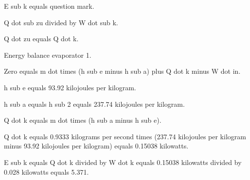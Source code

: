 E sub k equals question mark.

Q dot sub zu divided by W dot sub k.

Q dot zu equals Q dot k.

Energy balance evaporator 1.

Zero equals m dot times (h sub e minus h sub a) plus Q dot k minus W dot in.

h sub e equals 93.92 kilojoules per kilogram.

h sub a equals h sub 2 equals 237.74 kilojoules per kilogram.

Q dot k equals m dot times (h sub a minus h sub e).

Q dot k equals 0.9333 kilograms per second times (237.74 kilojoules per kilogram minus 93.92 kilojoules per kilogram) equals 0.15038 kilowatts.

E sub k equals Q dot k divided by W dot k equals 0.15038 kilowatts divided by 0.028 kilowatts equals 5.371.
